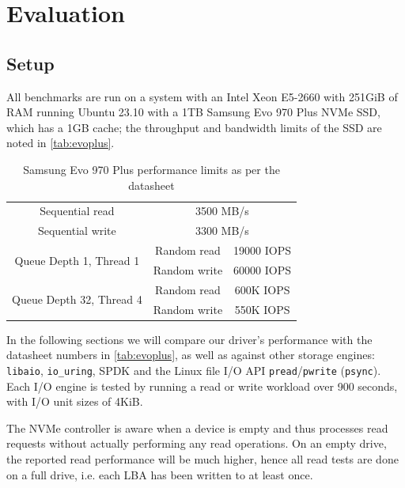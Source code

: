 \chapter{Evaluation}\label{chapter:eval}
\section{Setup}
All benchmarks are run on a system with an Intel Xeon E5-2660 with 251GiB of RAM running Ubuntu 23.10 with a 1TB Samsung Evo 970 Plus NVMe SSD, which has a 1GB cache; the throughput and bandwidth limits of the SSD are noted in \autoref{tab:evoplus}.

\begin{table}
    \centering
    \begin{tabular} { ||c|c|c|| }
        \cline{1-3}
        Sequential read & \multicolumn{2}{|c||}{3500 MB/s} \\ \cline{1-3}
        Sequential write & \multicolumn{2}{|c||}{3300 MB/s} \\ \cline{1-3}
        \multirow{2}{*}{Queue Depth 1, Thread 1} & Random read & 19000 IOPS \\ \cline{2-3}
                                                    & Random write & 60000 IOPS \\ \cline{1-3}
        \multirow{2}{*}{Queue Depth 32, Thread 4} & Random read & 600K IOPS \\ \cline{2-3}
                                                    & Random write & 550K IOPS \\ \cline{1-3}
    \end{tabular}
    \caption{Samsung Evo 970 Plus performance limits as per the datasheet}
    \label{tab:evoplus}
\end{table}

In the following sections we will compare our driver's performance with the datasheet numbers in \autoref{tab:evoplus}, as well as against other storage engines: \texttt{libaio}, \texttt{io\_uring}, SPDK and the Linux file I/O API \texttt{pread}/\texttt{pwrite} (\texttt{psync}). Each I/O engine is tested by running a read or write workload over 900 seconds, with I/O unit sizes of 4KiB.

The NVMe controller is aware when a device is empty and thus processes read requests without actually performing any read operations. On an empty drive, the reported read performance will be much higher, hence all read tests are done on a full drive, i.e. each LBA has been written to at least once.

